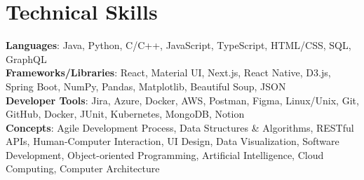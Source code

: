 \documentclass[letterpaper,10pt]{article}
\begin{document}
%
\section{Technical Skills}
\begin{itemize}[leftmargin=0.15in, label={}]
    \small{\item{
        \textbf{Languages}{: Java, Python, C/C++, JavaScript, TypeScript, HTML/CSS, SQL, GraphQL} \\
        \textbf{Frameworks/Libraries}{: React, Material UI, Next.js, React Native, D3.js, Spring Boot, NumPy, Pandas, Matplotlib, Beautiful Soup, JSON} \\
        \textbf{Developer Tools}{: Jira, Azure, Docker, AWS, Postman, Figma, Linux/Unix, Git, GitHub, Docker, JUnit, Kubernetes, MongoDB, Notion} \\
        \textbf{Concepts}{: Agile Development Process, Data Structures \& Algorithms, RESTful APIs, Human-Computer Interaction, UI Design, Data Visualization, Software Development, Object-oriented Programming, Artificial Intelligence, Cloud Computing, Computer Architecture} \\
        }}
\end{itemize}



\end{document}

